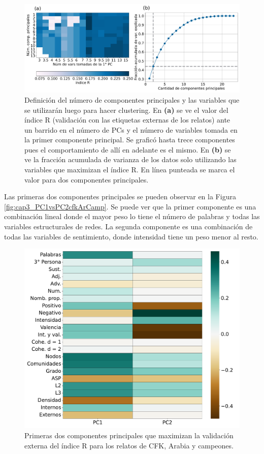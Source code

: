 \begin{figure}[h]
    \centering
    \includegraphics[width = 15cm]{figures/ch03/PCA_clustering/Primer tiempo/eleccionPCs_cfk_pres_ar_control.pdf} 
    \caption{Definición del número de componentes principales y las variables que se utilizarán luego para hacer clustering. En \textbf{(a)} se ve el valor del índice R (validación con las etiquetas externas de los relatos) ante un barrido en el número de PCs y el número de variables tomada en la primer componente principal. Se graficó hasta trece componentes pues el comportamiento de allí en adelante es el mismo. En \textbf{(b)} se ve la fracción acumulada de varianza de los datos solo utilizando las variables que maximizan el índice R. En línea punteada se marca el valor para dos componentes principales.}
\label{fig:cap3_defPCs_cfkArCamp}
\end{figure}


Las primeras dos componentes principales se pueden observar en la Figura \ref{fig:cap3_PC1vsPC2cfkArCamp}. Se puede ver que la primer componente es una combinación lineal donde el mayor peso lo tiene el número de palabras y todas las variables estructurales de redes. La segunda componente es una combinación de todas las variables de sentimiento, donde intensidad tiene un peso menor al resto.


\begin{figure}[h]
    \centering
    \includegraphics[width = 15cm]{figures/ch03/PCA_clustering/Primer tiempo/2PCs_cfk_pres_ar_control.pdf} 
    \caption{Primeras dos componentes principales que maximizan la validación externa del índice R para los relatos de CFK, Arabia y campeones.}
\label{fig:cap3_2PCscfkArCamp}
\end{figure}

